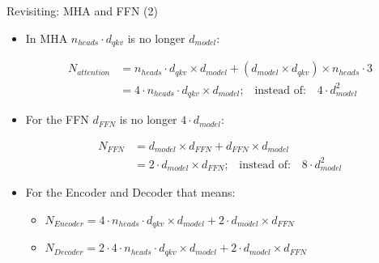 
\begin{frame}{Revisiting: MHA and FFN (2)}

\begin{itemize}
    \item In MHA $n_{heads} \cdot d_{qkv}$ is no longer $d_{model}$:

$$
\begin{aligned}
N_{attention} &= n_{heads} \cdot d_{qkv} \times d_{model} + (d_{model} \times d_{qkv}) \times n_{heads} \cdot 3 \\
&= 4\cdot n_{heads}\cdot d_{qkv} \times d_{model}\text{;}\quad \text{instead of:}\quad 4\cdot d_{model}^2
\end{aligned}
$$

\hspace{}
    
    \item For the FFN $d_{FFN}$ is no longer $4\cdot d_{model}$:

$$    
\begin{aligned}
N_{FFN} &= d_{model} \times d_{FFN} + d_{FFN} \times d_{model} \\
&= 2\cdot d_{model} \times d_{FFN}\text{;}\quad \text{instead of:}\quad 8\cdot d_{model}^2
\end{aligned}
$$

\hspace{}

    \item For the Encoder and Decoder that means:
    \begin{itemize}
        \item $N_{Encoder} = 4\cdot n_{heads}\cdot d_{qkv} \times d_{model} + 2\cdot d_{model} \times d_{FFN}$
        \item $N_{Decoder} = 2\cdot 4\cdot n_{heads}\cdot d_{qkv} \times d_{model} + 2\cdot d_{model} \times d_{FFN} $
    \end{itemize}

\end{itemize}
    
\end{frame}


